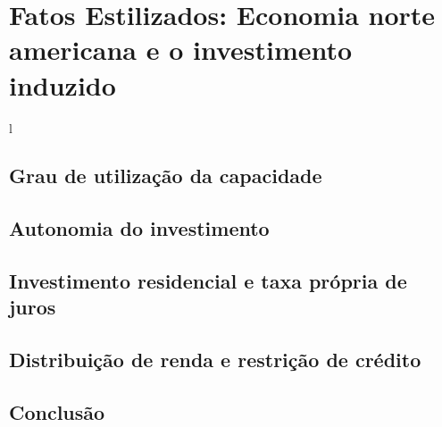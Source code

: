 \chapter{Fatos Estilizados: Economia norte americana e o investimento induzido}l\label{CapFatos}

\textcite{serrano_trabajadores_2008}

\section{Grau de utilização da capacidade}

\section{Autonomia do investimento}

\section{Investimento residencial e taxa própria de juros}

\section{Distribuição de renda e restrição de crédito}

\section{Conclusão}